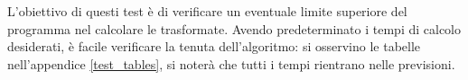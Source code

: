 L'obiettivo di questi test \`e di verificare un eventuale limite superiore del
programma nel calcolare le trasformate. Avendo predeterminato i tempi di calcolo
desiderati, \`e facile verificare la tenuta dell'algoritmo: si osservino le
tabelle nell'appendice \ref{test_tables}, si noter\`a che tutti i tempi
rientrano nelle previsioni.
